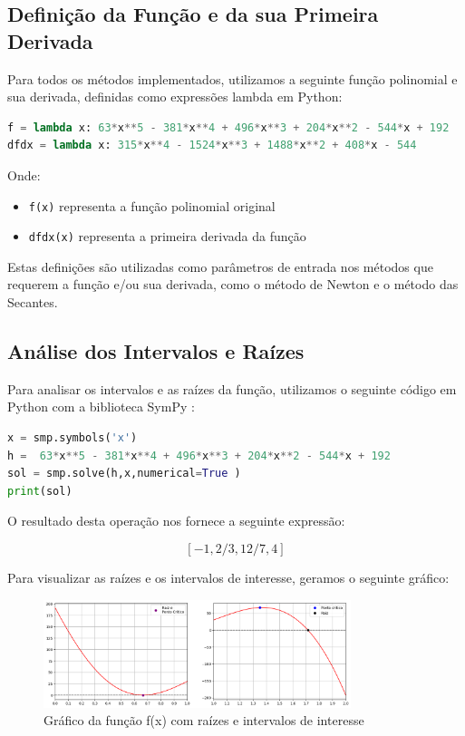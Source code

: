 \documentclass{article}
\begin{document}
\subsection{Defini\c{c}\~{a}o da Fun\c{c}\~{a}o e da sua Primeira Derivada}

Para todos os m\'{e}todos implementados, utilizamos a seguinte fun\c{c}\~{a}o polinomial e sua derivada, definidas como express\~{o}es lambda em Python:

\begin{lstlisting}[language=Python]
f = lambda x: 63*x**5 - 381*x**4 + 496*x**3 + 204*x**2 - 544*x + 192
dfdx = lambda x: 315*x**4 - 1524*x**3 + 1488*x**2 + 408*x - 544
\end{lstlisting}

Onde:
\begin{itemize}
    \item \texttt{f(x)} representa a fun\c{c}\~{a}o polinomial original
    \item \texttt{dfdx(x)} representa a  primeira derivada da fun\c{c}\~{a}o
\end{itemize}

Estas defini\c{c}\~{o}es s\~{a}o utilizadas como par\^{a}metros de entrada nos m\'{e}todos que requerem a fun\c{c}\~{a}o e/ou sua derivada, como o m\'{e}todo de Newton e o m\'{e}todo das Secantes.

\subsection{An\'{a}lise dos Intervalos e Ra\'{i}zes}

Para analisar os intervalos e as ra\'{i}zes da fun\c{c}\~{a}o, utilizamos o seguinte c\'{o}digo em Python com a biblioteca SymPy \cite{sympy}:

\begin{lstlisting}[language=Python]
x = smp.symbols('x')
h =  63*x**5 - 381*x**4 + 496*x**3 + 204*x**2 - 544*x + 192
sol = smp.solve(h,x,numerical=True )
print(sol)
\end{lstlisting}

O resultado desta opera\c{c}\~{a}o nos fornece a seguinte express\~{a}o:

\[
[-1, 2/3, 12/7, 4]
\]

Para visualizar as ra\'{i}zes e os intervalos de interesse, geramos o seguinte gr\'{a}fico:

\begin{figure}[h]
\centering
\includegraphics[width=0.8\textwidth]{output.png}
\caption{Gr\'{a}fico da fun\c{c}\~{a}o f(x) com ra\'{i}zes e intervalos de interesse}
\label{fig:funcao_grafico}
\end{figure}
\end{document}
